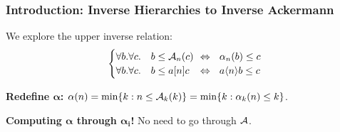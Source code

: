 \begin{frame}
\frametitle{Introduction: Inverse Hierarchies to Inverse Ackermann}

We explore the upper inverse relation:
\begin{equation*}
\begin{cases}
\forall b. \forall c.\quad b \le \Ack_n(c) & \!\! \iff \ \ \alpha_n(b)\le c \\
\forall b. \forall c. \quad b \le a[n]c & \!\! \iff \ \ a\angle{n}b \le c
\end{cases}
\end{equation*}

\textbf{Redefine $\bm{\alpha}$:}
$\alpha(n) = \min\{k: n\le \mathcal{A}_k(k) \} = \min\{k: \alpha_k(n)\le k \}$.

\bigskip

\pause
\textbf{Computing $\bm{\alpha} $ through $\bm{\alpha_i}$!} No need to go through $\mathcal{A}$.

\bigskip

\pause
{}

\end{frame}






